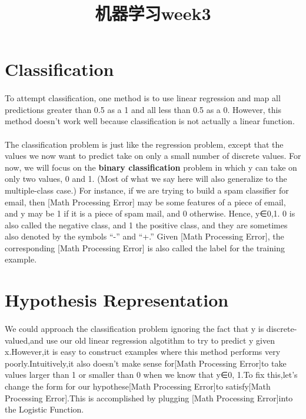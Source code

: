 \documentclass[UTF8]{ctexart}
\title{机器学习week3}
\author{  }
\date{}
\begin{document}
\maketitle
\tableofcontents

\newpage
\section{Classification}

\paragraph{}
To attempt classification, one method is to use linear regression and map all predictions greater than 0.5 as a 1 and all less than 0.5 as a 0. However, this method doesn't work well because classification is not actually a linear function.
\paragraph{}
The classification problem is just like the regression problem, except that the values we now want to predict take on only a small number of discrete values. For now, we will focus on the \textbf{binary classification} problem in which y can take on only two values, 0 and 1. (Most of what we say here will also generalize to the multiple-class case.) For instance, if we are trying to build a spam classifier for email, then [Math Processing Error] may be some features of a piece of email, and y may be 1 if it is a piece of spam mail, and 0 otherwise. Hence, y∈{0,1}. 0 is also called the negative class, and 1 the positive class, and they are sometimes also denoted by the symbols “-” and “+.” Given [Math Processing Error], the corresponding [Math Processing Error] is also called the label for the training example.

\newpage
\section{Hypothesis Representation}
\paragraph{}
We could approach the classification problem ignoring the fact that y is discrete-valued,and use our old linear regression algotithm to try to predict y given x.However,it is easy to construct examples where this method performs very poorly.Intuitively,it also doesn't make sense for[Math Processing Error]to take values larger than 1 or smaller than 0 when we know that y∈{0, 1}.To fix this,let's change the form for our hypothese[Math Processing Error]to satisfy[Math Processing Error].This is accomplished by plugging [Math Processing Error]into the Logistic Function.
\end{document}
